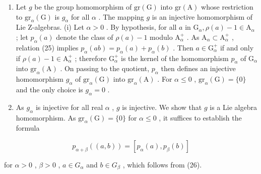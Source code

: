 \begin{enumerate}
\def\labelenumi{(\roman{enumi})}
\setcounter{enumi}{1}
\item
  Let \(g\) be the group homomorphism of \(\mathrm{gr}(\mathrm{G})\) into \(\mathrm{gr}(\mathrm{A})\) whose restriction to \(\mathrm{gr}_{\alpha}(\mathrm{G})\) is \(g_{\alpha}\) for all \(\alpha\) . The mapping \(g\) is an injective homomorphism of Lie Z-algebras. (i) Let \(\alpha > 0\) . By hypothesis, for all \(a\) in \(\mathrm{G}_{\alpha}, \rho(a) - 1 \in \mathrm{A}_{\alpha}\) ; let \(p_{\alpha}(a)\) denote the class of \(\rho(a) - 1\) modulo \(\mathrm{A}_{\alpha}^{+}\) . As \(\mathrm{A}_{\alpha} \subset \mathrm{A}_{\alpha}^{+}\) , relation (25) implies \(p_{\alpha}(ab) = p_{\alpha}(a) + p_{\alpha}(b)\) . Then \(a \in \mathrm{G}_{\alpha}^{+}\) if and only if \(\rho(a) - 1 \in \mathrm{A}_{\alpha}^{+}\) ; therefore \(\mathrm{G}_{\alpha}^{+}\) is the kernel of the homomorphism \(p_{\alpha}\) of \(\mathrm{G}_{\alpha}\) into \(\mathrm{gr}_{\alpha}(\mathrm{A})\) . On passing to the quotient, \(p_{\alpha}\) then defines an injective homomorphism \(g_{\alpha}\) of \(\mathrm{gr}_{\alpha}(\mathrm{G})\) into \(\mathrm{gr}_{\alpha}(\mathrm{A})\) . For \(\alpha \leqslant 0\) , \(\mathrm{gr}_{\alpha}(\mathrm{G}) = \{0\}\) and the only choice is \(g_{\alpha} = 0\) .
\item
  As \(g_{\alpha}\) is injective for all real \(\alpha\) , \(g\) is injective. We show that \(g\) is a Lie algebra homomorphism. As \(\mathrm{gr}_{\alpha}(\mathrm{G}) = \{0\}\) for \(\alpha \leqslant 0\) , it suffices to establish the formula
\end{enumerate}

\[
p _ {\alpha + \beta} ((a, b)) = [ p _ {\alpha} (a), p _ {\beta} (b) ]\tag{27}
\]

for \(\alpha > 0\) , \(\beta > 0\) , \(a \in G_{\alpha}\) and \(b \in G_{\beta}\) , which follows from (26).


